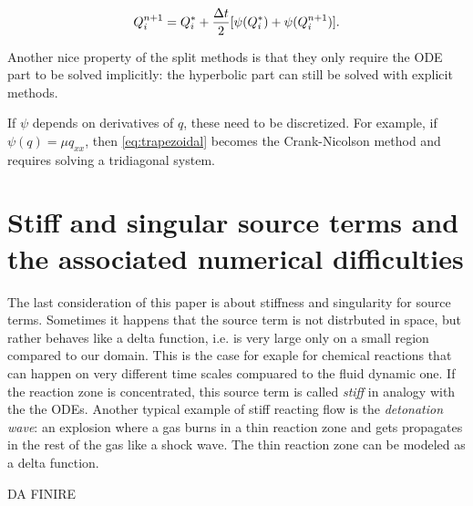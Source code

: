 \documentclass[journal,onecolumn]{IEEEtran}
\begin{document}
\begin{equation}\label{eq:trapezoidal}
	Q_i^{n+1} = Q_i^*+\frac{\Delta t}{2}[\psi(Q_i^*)+\psi(Q_i^{n+1})].
\end{equation}

Another nice property of the split methods is that they only require the ODE part to be solved implicitly: the hyperbolic part can still be solved with explicit methods.

If $\psi$ depends on derivatives of $q$, these need to be discretized. For example, if $\psi(q)=\mu q_{xx}$, then \eqref{eq:trapezoidal} becomes the Crank-Nicolson method and requires solving a tridiagonal system.

\section{Stiff and singular source terms and the associated numerical difficulties} \label{stiff}

The last consideration of this paper is about stiffness and singularity for source terms. Sometimes it happens that the source term is not distrbuted in space, but rather behaves like a delta function, i.e. is very large only on a small region compared to our domain. This is the case for exaple for chemical reactions that can happen on very different time scales compuared to the fluid dynamic one. If the reaction zone is concentrated, this source term is called \textit{stiff} in analogy with the the ODEs. Another typical example of stiff reacting flow is the \textit{detonation wave}: an explosion where a gas burns in a thin reaction zone and gets propagates in the rest of the gas like a shock wave. The thin reaction zone can be modeled as a delta function.

\huge DA FINIRE


%
\end{document}
